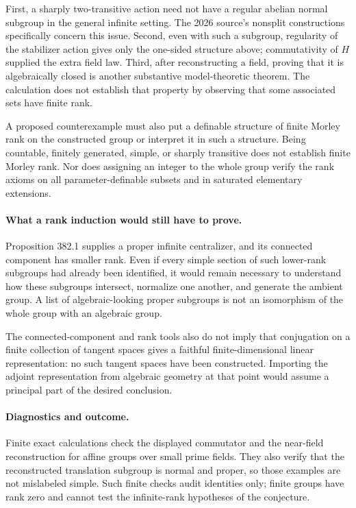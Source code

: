 \documentclass[11pt]{article}
\begin{document}
First, a sharply two-transitive action need not have a regular abelian
normal subgroup in the general infinite setting. The 2026 source's
nonsplit constructions specifically concern this issue. Second, even
with such a subgroup, regularity of the stabilizer action gives only
the one-sided structure above; commutativity of $H$ supplied the extra
field law. Third, after reconstructing a field, proving that it is
algebraically closed is another substantive model-theoretic theorem.
The calculation does not establish that property by observing that
some associated sets have finite rank.

A proposed counterexample must also put a definable structure of finite
Morley rank on the constructed group or interpret it in such a structure.
Being countable, finitely generated, simple, or sharply transitive does
not establish finite Morley rank. Nor does assigning an integer to the
whole group verify the rank axioms on all parameter-definable subsets
and in saturated elementary extensions.

\paragraph{What a rank induction would still have to prove.}
Proposition 382.1 supplies a proper infinite centralizer, and its
connected component has smaller rank. Even if every simple section
of such lower-rank subgroups had already been identified, it would
remain necessary to understand how these subgroups intersect, normalize
one another, and generate the ambient group. A list of algebraic-looking
proper subgroups is not an isomorphism of the whole group with an
algebraic group.

The connected-component and rank tools also do not imply that conjugation
on a finite collection of tangent spaces gives a faithful finite-dimensional
linear representation: no such tangent spaces have been constructed.
Importing the adjoint representation from algebraic geometry at that
point would assume a principal part of the desired conclusion.

\paragraph{Diagnostics and outcome.}
Finite exact calculations check the displayed commutator and the
near-field reconstruction for affine groups over small prime fields.
They also verify that the reconstructed translation subgroup is normal
and proper, so those examples are not mislabeled simple. Such finite
checks audit identities only; finite groups have rank zero and cannot
test the infinite-rank hypotheses of the conjecture.
\end{document}
